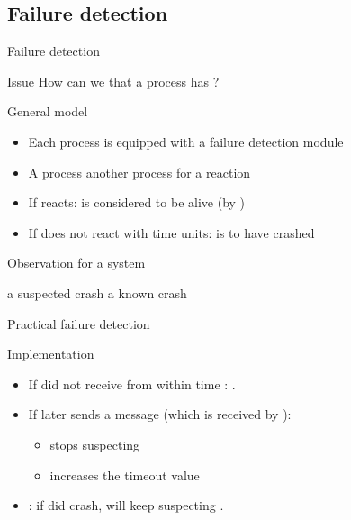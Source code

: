 \subsection{Failure detection}
\begin{slide}{Failure detection}
  \begin{block}{Issue}
    How can we  that a process has ?
  \end{block}
  \begin{block}{General model}
    \begin{itemize}
    \item Each process is equipped with a failure detection module
    \item A process   another process  for a reaction
    \item If  reacts:  is considered to be alive (by )
    \item If  does not react with  time units:  is  to have crashed
    \end{itemize}
  \end{block}
  \begin{alertblock}{Observation for a  system}
    \begin{center}
      a suspected crash \mathexpr{\equiv} a known crash
    \end{center}
  \end{alertblock}
\end{slide}
\begin{slide}{Practical failure detection}
  \begin{block}{Implementation}
    \begin{itemize}
    \item If  did not receive  from  within time : .
    \item If  later sends a message (which is received by ):
      \begin{itemize}
      \item {} stops suspecting 
      \item {} increases the timeout value 
      \end{itemize}
    \item {}: if  did crash,  will keep suspecting .
    \end{itemize}
  \end{block}
\end{slide}
